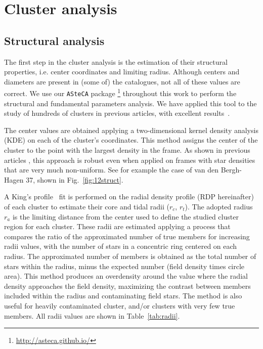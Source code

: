 \documentclass[draft]{aa}
\begin{document}
\section{Cluster analysis}
 \label{sec:clust_analy}

 \subsection{Structural analysis}

  The first step in the cluster analysis is the estimation of their structural
  properties, i.e. center coordinates and limiting radius. Although centers and
  diameters are present in (some of) the catalogues, not all of these values are
  correct. We use our \texttt{ASteCA} package
  \citep{Perren_2015}\footnote{\url{http://asteca.github.io/}} throughout this
  work to perform the structural and fundamental parameters analysis. We have
  applied this tool to the study of hundreds of clusters in previous articles,
  with excellent results~\citep{Perren_2017,Perren_2020}.

  The center values are obtained applying a two-dimensional kernel density
  analysis (KDE) on each of the cluster's coordinates. This method assigns the
  center of the cluster to the point with the largest density in the frame. As
  shown in previous articles \citep{Perren_2015,Perren_2017,Perren_2020}, this
  approach is robust even when applied on frames with star densities that
  are very much non-uniform. See for example the case of van den Bergh-Hagen 37,
  shown in Fig.~\ref{fig:12struct}.

  A King's profile~\citep{King_1962} fit is performed on the radial
  density profile (RDP hereinafter) of each cluster to estimate their core and
  tidal radii ($r_{c}$, $r_{t}$). The adopted radius $r_{a}$ is the limiting
  distance from the center used to define the studied cluster region for each
  cluster. These radii are estimated applying a process that compares the
  ratio of the approximated number of true members for increasing radii values,
  with the number of stars in a concentric ring centered on each radius. The
  approximated number of members is obtained as the total number of stars within
  the radius, minus the expected number (field density times circle area). This
  method produces an overdensity around the value where the radial density
  approaches the field density, maximizing the contrast between members included
  within the radius and contaminating field stars. The method is also useful
  for heavily contaminated cluster, and/or clusters with very few true
  members. All radii values are shown in Table~\ref{tab:radii}.\\
\end{document}
